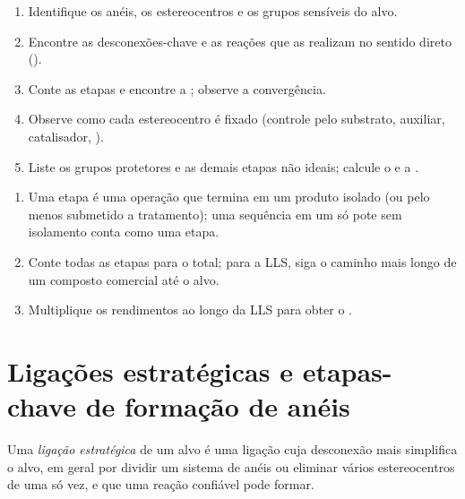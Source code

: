 \begin{method}\label{met:b3:total-synthesis:analyse}
\begin{enumerate}
  \item Identifique os anéis, os estereocentros e os grupos sensíveis do alvo.
  \item Encontre as desconexões-chave e as reações que as realizam no sentido direto
        ().
  \item Conte as etapas e encontre a ; observe a convergência.
  \item Observe como cada estereocentro é fixado (controle pelo substrato, auxiliar, catalisador,
        ).
  \item Liste os grupos protetores e as demais etapas não ideais; calcule o  e a .
\end{enumerate}
\end{method}

\begin{method}\label{met:b3:total-synthesis:count}
\begin{enumerate}
  \item Uma etapa é uma operação que termina em um produto isolado (ou pelo menos submetido a
        tratamento); uma sequência em um só pote sem isolamento conta como uma etapa.
  \item Conte todas as etapas para o total; para a LLS, siga o caminho mais longo de um
        composto comercial até o alvo.
  \item Multiplique os rendimentos ao longo da LLS para obter o .
\end{enumerate}
\end{method}

\section{Ligações estratégicas e etapas-chave de formação de anéis}

\begin{definition}\label{def:b3:total-synthesis:strategic-bond}
Uma \emph{ligação estratégica} de um alvo é uma ligação cuja
desconexão mais simplifica o alvo, em geral por dividir um sistema de anéis
ou eliminar vários estereocentros de uma só vez, e que uma reação confiável pode
formar.
\end{definition}

